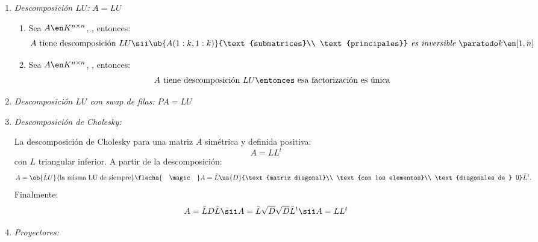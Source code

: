 \begin{enumerate}[label=\tiny\purple{\faIcon{snowman}}]
  \item \textit{Descomposición $LU$:} \quad $A = LU$
        \begin{enumerate}[label={\tiny\faIcon{pray}$_{\arabic*)}$}]
          \item Sea $A \en K^{n \times n}$, , entonces:
                $$
                  A \text{ tiene descomposición } LU \sii
                  \ub{A(1:k,1:k)}{\text{submatrices}\\ \text{principales}}
                  \textit{ es inversible } \paratodo k \en [1,n]
                $$
          \item Sea $A \en K^{n \times n}$, , entonces:
                $$
                  A \text{ tiene descomposición } LU
                  \entonces
                  \text{ esa factorización es única }
                $$
        \end{enumerate}

  \item \textit{Descomposición $LU$ con swap de filas:} \quad $PA = LU$

  \item \hypertarget{teoría-3:cholesky}{\textit{Descomposición de Cholesky:}}

        La descomposición de Cholesky para una matriz $A$ simétrica y definida positiva:
        $$
          A = L L^t
        $$
        con $L$ triangular inferior. A partir de la descomposición:
        $$
          A = \ob{\tilde{L} U}{\text{la misma LU de siempre}}
          \flecha{\quad\magic\quad}
          A = \tilde{L}
          \ua{D}{\text{matriz diagonal}\\ \text{con los elementos}\\ \text{diagonales de } U} \tilde{L}^t
          .
        $$
        Finalmente:
        $$
          A = \tilde{L} D \tilde{L}
          \sii
          A = \tilde{L} \sqrt{D} \sqrt{D} \tilde{L}^t
          \sii
          A = LL^t
        $$

  \item \hypertarget{teoria-3:proyector}{\textit{Proyectores:}}


\end{enumerate}
